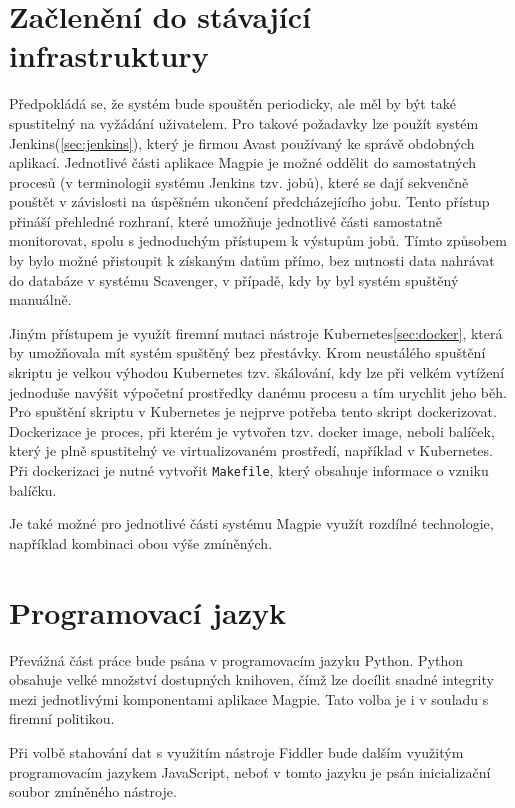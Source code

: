 \documentclass[thesis=M,czech,hidelinks]{FITthesis}[2013/05/06]
\begin{document}
\section{Začlenění do stávající infrastruktury}
Předpokládá se, že systém bude spouštěn periodicky, ale měl by být také spustitelný na vyžádání uživatelem. Pro takové požadavky lze použít systém Jenkins(\ref{sec:jenkins}), který je firmou Avast používaný ke správě obdobných aplikací. Jednotlivé části aplikace Magpie je možné oddělit do samostatných procesů (v terminologii systému Jenkins tzv. jobů), které se dají sekvenčně pouštět v závislosti na úspěšném ukončení předcházejícího jobu. Tento přístup přináší přehledné rozhraní, které umožňuje jednotlivé části samostatně monitorovat, spolu s jednoduchým přístupem k výstupům jobů. Tímto způsobem by bylo možné přistoupit k získaným datům přímo, bez nutnosti data nahrávat do databáze v systému Scavenger, v případě, kdy by byl systém spuštěný manuálně.

Jiným přístupem je využít firemní mutaci nástroje Kubernetes\ref{sec:docker}, která by umožňovala mít systém spuštěný bez přestávky. Krom neustálého spuštění skriptu je velkou výhodou Kubernetes tzv. škálování, kdy lze při velkém vytížení jednoduše navýšit výpočetní prostředky danému procesu a tím urychlit jeho běh. Pro spuštění skriptu v Kubernetes je nejprve potřeba tento skript dockerizovat. Dockerizace je proces, při kterém je vytvořen tzv. docker image, neboli balíček, který je plně spustitelný ve virtualizovaném prostředí, například v Kubernetes. Při dockerizaci je nutné vytvořit \texttt{Makefile}, který obsahuje informace o vzniku balíčku. 

Je také možné pro jednotlivé části systému Magpie využít rozdílné technologie, například kombinaci obou výše zmíněných.

\section{Programovací jazyk}
Převážná část práce bude psána v programovacím jazyku Python\cite{python}. Python obsahuje velké množství dostupných knihoven, čímž lze docílit snadné integrity mezi jednotlivými komponentami aplikace Magpie. Tato volba je i v souladu s firemní politikou. 

Při volbě stahování dat s využitím nástroje Fiddler bude dalším využitým programovacím jazykem JavaScript, neboť v tomto jazyku je psán inicializační soubor zmíněného nástroje.
\end{document}
